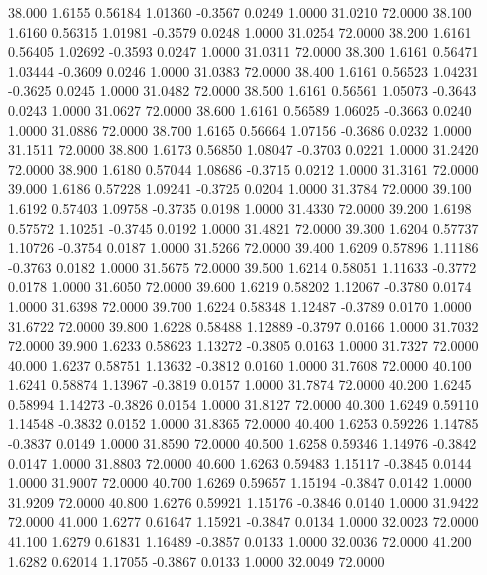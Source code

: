   38.000   1.6155   0.56184   1.01360  -0.3567   0.0249   1.0000  31.0210  72.0000
  38.100   1.6160   0.56315   1.01981  -0.3579   0.0248   1.0000  31.0254  72.0000
  38.200   1.6161   0.56405   1.02692  -0.3593   0.0247   1.0000  31.0311  72.0000
  38.300   1.6161   0.56471   1.03444  -0.3609   0.0246   1.0000  31.0383  72.0000
  38.400   1.6161   0.56523   1.04231  -0.3625   0.0245   1.0000  31.0482  72.0000
  38.500   1.6161   0.56561   1.05073  -0.3643   0.0243   1.0000  31.0627  72.0000
  38.600   1.6161   0.56589   1.06025  -0.3663   0.0240   1.0000  31.0886  72.0000
  38.700   1.6165   0.56664   1.07156  -0.3686   0.0232   1.0000  31.1511  72.0000
  38.800   1.6173   0.56850   1.08047  -0.3703   0.0221   1.0000  31.2420  72.0000
  38.900   1.6180   0.57044   1.08686  -0.3715   0.0212   1.0000  31.3161  72.0000
  39.000   1.6186   0.57228   1.09241  -0.3725   0.0204   1.0000  31.3784  72.0000
  39.100   1.6192   0.57403   1.09758  -0.3735   0.0198   1.0000  31.4330  72.0000
  39.200   1.6198   0.57572   1.10251  -0.3745   0.0192   1.0000  31.4821  72.0000
  39.300   1.6204   0.57737   1.10726  -0.3754   0.0187   1.0000  31.5266  72.0000
  39.400   1.6209   0.57896   1.11186  -0.3763   0.0182   1.0000  31.5675  72.0000
  39.500   1.6214   0.58051   1.11633  -0.3772   0.0178   1.0000  31.6050  72.0000
  39.600   1.6219   0.58202   1.12067  -0.3780   0.0174   1.0000  31.6398  72.0000
  39.700   1.6224   0.58348   1.12487  -0.3789   0.0170   1.0000  31.6722  72.0000
  39.800   1.6228   0.58488   1.12889  -0.3797   0.0166   1.0000  31.7032  72.0000
  39.900   1.6233   0.58623   1.13272  -0.3805   0.0163   1.0000  31.7327  72.0000
  40.000   1.6237   0.58751   1.13632  -0.3812   0.0160   1.0000  31.7608  72.0000
  40.100   1.6241   0.58874   1.13967  -0.3819   0.0157   1.0000  31.7874  72.0000
  40.200   1.6245   0.58994   1.14273  -0.3826   0.0154   1.0000  31.8127  72.0000
  40.300   1.6249   0.59110   1.14548  -0.3832   0.0152   1.0000  31.8365  72.0000
  40.400   1.6253   0.59226   1.14785  -0.3837   0.0149   1.0000  31.8590  72.0000
  40.500   1.6258   0.59346   1.14976  -0.3842   0.0147   1.0000  31.8803  72.0000
  40.600   1.6263   0.59483   1.15117  -0.3845   0.0144   1.0000  31.9007  72.0000
  40.700   1.6269   0.59657   1.15194  -0.3847   0.0142   1.0000  31.9209  72.0000
  40.800   1.6276   0.59921   1.15176  -0.3846   0.0140   1.0000  31.9422  72.0000
  41.000   1.6277   0.61647   1.15921  -0.3847   0.0134   1.0000  32.0023  72.0000
  41.100   1.6279   0.61831   1.16489  -0.3857   0.0133   1.0000  32.0036  72.0000
  41.200   1.6282   0.62014   1.17055  -0.3867   0.0133   1.0000  32.0049  72.0000
